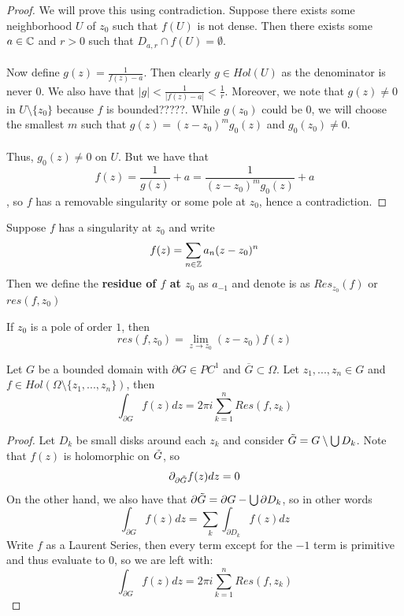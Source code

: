 \documentclass{article}
\begin{document}
\begin{proof}
We will prove this using contradiction. Suppose there exists some neighborhood $U$ of $z_0$ such that $f(U)$ is not dense. Then there exists some $a \in \mathbb{C}$ and $r > 0$ such that $D_{a, r} \cap f(U) = \emptyset$.\\\\
Now define $g(z) = \frac{1}{f(z) - a}$. Then clearly $g \in Hol(U)$ as the denominator is never $0$. We also have that $|g| < \frac{1}{|f(z) - a|} < \frac{1}{r}$. Moreover, we note that $g(z) \neq 0$ in $U \setminus \{z_0\}$ because $f$ is bounded?????. While $g(z_0)$ could be $0$, we will choose the smallest $m$ such that $g(z) = (z - z_0)^m g_0(z)$ and $g_0(z_0) \neq 0$.\\\\
Thus, $g_0(z) \neq 0$ on $U$. But we have that
\[f(z) = \frac{1}{g(z)} + a = \frac{1}{(z - z_0)^m g_0(z)} + a\]
, so $f$ has a removable singularity or some pole at $z_0$, hence a contradiction.
\end{proof}

\begin{definition}
    Suppose $f$ has a singularity at $z_0$ and write
    \[f(z) = \sum_{n \in \mathbb{Z}} a_n (z - z_0)^n\]
    Then we define the \textbf{residue of $f$ at $z_0$} as $a_{-1}$ and denote is as $Res_{z_0}(f)$ or $res(f, z_0)$
\end{definition}

\begin{remark}
If $z_0$ is a pole of order $1$, then
\[res(f, z_0) = \lim_{z \to z_0} (z - z_0)f(z)\]
\end{remark}

\begin{theorem}
Let $G$ be a bounded domain with $\partial G \in PC^1$ and $\overline{G} \subset \Omega$. Let $z_1, ..., z_n \in G$ and $f \in Hol(\Omega \setminus \{z_1, ..., z_n\})$, then
\[\int_{\partial G} f(z) dz = 2\pi i \sum_{k = 1}^n Res(f, z_k)\]
\end{theorem}

\begin{proof}
Let $D_k$ be small disks around each $z_k$ and consider $\Tilde{G} = G \setminus \bigcup D_k$. Note that $f(z)$ is holomorphic on $\Tilde{G}$, so
\[\partial_{\partial \Tilde{G}} f(z) dz = 0\]
On the other hand, we also have that $\partial \Tilde{G} = \partial G - \bigcup \partial D_k$, so in other words
\[\int_{\partial G} f(z) dz = \sum_k \int_{\partial D_k} f(z) dz\]
Write $f$ as a Laurent Series, then every term except for the $-1$ term is primitive and thus evaluate to $0$, so we are left with:
\[\int_{\partial G} f(z) dz = 2\pi i \sum_{k = 1}^n Res(f, z_k)\]
\end{proof}
\end{document}
